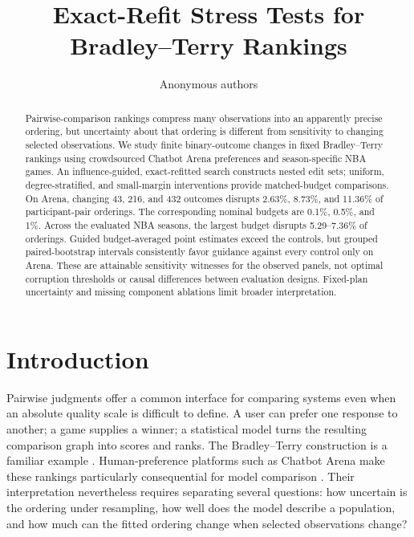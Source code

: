 \documentclass{article}
\title{Exact-Refit Stress Tests for Bradley--Terry Rankings}
\author{Anonymous authors}
\begin{document}
\maketitle

\begin{abstract}
Pairwise-comparison rankings compress many observations into an apparently precise ordering, but uncertainty about that ordering is different from sensitivity to changing selected observations. We study finite binary-outcome changes in fixed Bradley--Terry rankings using crowdsourced Chatbot Arena preferences and season-specific NBA games. An influence-guided, exact-refitted search constructs nested edit sets; uniform, degree-stratified, and small-margin interventions provide matched-budget comparisons. On Arena, changing 43, 216, and 432 outcomes disrupts 2.63\%, 8.73\%, and 11.36\% of participant-pair orderings. The corresponding nominal budgets are 0.1\%, 0.5\%, and 1\%. Across the evaluated NBA seasons, the largest budget disrupts 5.29--7.36\% of orderings. Guided budget-averaged point estimates exceed the controls, but grouped paired-bootstrap intervals consistently favor guidance against every control only on Arena. These are attainable sensitivity witnesses for the observed panels, not optimal corruption thresholds or causal differences between evaluation designs. Fixed-plan uncertainty and missing component ablations limit broader interpretation.
\end{abstract}

\section{Introduction}
Pairwise judgments offer a common interface for comparing systems even when an absolute quality scale is difficult to define. A user can prefer one response to another; a game supplies a winner; a statistical model turns the resulting comparison graph into scores and ranks. The Bradley--Terry construction is a familiar example \citep{Hunter2004}. Human-preference platforms such as Chatbot Arena make these rankings particularly consequential for model comparison \citep{Chiang2024}. Their interpretation nevertheless requires separating several questions: how uncertain is the ordering under resampling, how well does the model describe a population, and how much can the fitted ordering change when selected observations change?
\end{document}
